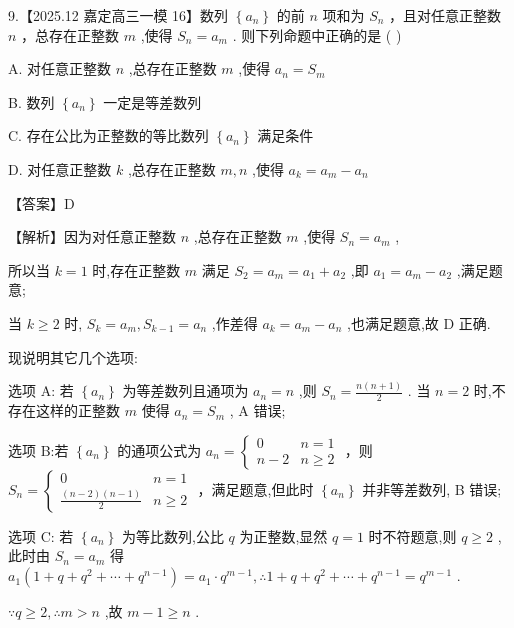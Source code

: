 \documentclass[10pt]{article}
\begin{document}
9.【2025.12 嘉定高三一模 16】数列 \(\left\{  {a}_{n}\right\}\) 的前 \(n\) 项和为 \({S}_{n}\) ，且对任意正整数 \(n\) ，总存在正整数 \(m\) ,使得 \({S}_{n} = {a}_{m}\) . 则下列命题中正确的是 ( )

A. 对任意正整数 \(n\) ,总存在正整数 \(m\) ,使得 \({a}_{n} = {S}_{m}\)

B. 数列 \(\left\{  {a}_{n}\right\}\) 一定是等差数列

C. 存在公比为正整数的等比数列 \(\left\{  {a}_{n}\right\}\) 满足条件

D. 对任意正整数 \(k\) ,总存在正整数 \(m,n\) ,使得 \({a}_{k} = {a}_{m} - {a}_{n}\)

【答案】D

【解析】因为对任意正整数 \(n\) ,总存在正整数 \(m\) ,使得 \({S}_{n} = {a}_{m}\) ,

所以当 \(k = 1\) 时,存在正整数 \(m\) 满足 \({S}_{2} = {a}_{m} = {a}_{1} + {a}_{2}\) ,即 \({a}_{1} = {a}_{m} - {a}_{2}\) ,满足题意;

当 \(k \geq  2\) 时, \({S}_{k} = {a}_{m},{S}_{k - 1} = {a}_{n}\) ,作差得 \({a}_{k} = {a}_{m} - {a}_{n}\) ,也满足题意,故 \(\mathrm{D}\) 正确.

现说明其它几个选项:

选项 A: 若 \(\left\{  {a}_{n}\right\}\) 为等差数列且通项为 \({a}_{n} = n\) ,则 \({S}_{n} = \frac{n\left( {n + 1}\right) }{2}\) . 当 \(n = 2\) 时,不存在这样的正整数 \(m\) 使得 \({a}_{n} = {S}_{m}\) , A 错误;

选项 B:若 \(\left\{  {a}_{n}\right\}\) 的通项公式为 \({a}_{n} = \left\{  \begin{array}{ll} 0 & n = 1 \\  n - 2 & n \geq  2 \end{array}\right.\) ，则 \({S}_{n} = \left\{  \begin{array}{ll} 0 & n = 1 \\  \frac{\left( {n - 2}\right) \left( {n - 1}\right) }{2} & n \geq  2 \end{array}\right.\) ，满足题意,但此时 \(\left\{  {a}_{n}\right\}\) 并非等差数列, B 错误;

选项 C: 若 \(\left\{  {a}_{n}\right\}\) 为等比数列,公比 \(q\) 为正整数,显然 \(q = 1\) 时不符题意,则 \(q \geq  2\) ,此时由 \({S}_{n} = {a}_{m}\) 得 \({a}_{1}\left( {1 + q + {q}^{2} + \cdots  + {q}^{n - 1}}\right)  = {a}_{1} \cdot  {q}^{m - 1},\therefore 1 + q + {q}^{2} + \cdots  + {q}^{n - 1} = {q}^{m - 1}\) .

\(\because q \geq  2,\therefore m > n\) ,故 \(m - 1 \geq  n\) .
\end{document}
